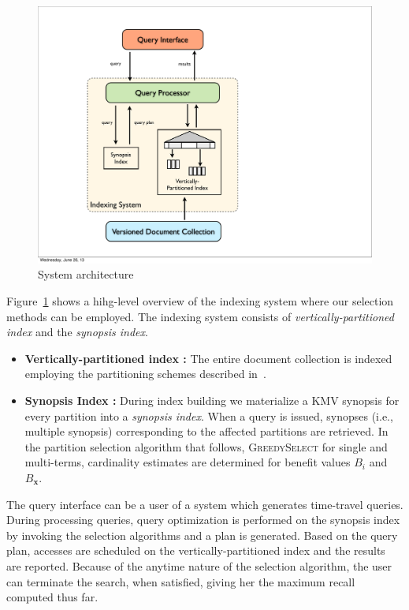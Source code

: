 \begin{figure}[tb]
  \centering
    \includegraphics[width=0.6\columnwidth]{resources/selection-sysarch.pdf}
  \caption{System architecture} 
    \label{fig:selection_sysarch}
\end{figure}

Figure~\ref{fig:selection_sysarch} shows a hihg-level overview of the indexing system where our selection methods can be employed. The indexing system consists of \emph{vertically-partitioned index} and the \emph{synopsis index}.

\begin{itemize}

\item{\textbf{Vertically-partitioned index :}} The entire document collection is indexed employing the partitioning schemes described in~\cite{kberberi:sigir2007}. 

\item{\textbf{Synopsis Index :}} During index building we materialize a KMV synopsis for every partition into a \emph{synopsis index}. When a query is issued, synopses (i.e., multiple synopsis) corresponding to the affected partitions are retrieved. In the partition selection algorithm that follows, \textsc{GreedySelect} for single and multi-terms, cardinality estimates are determined for benefit values $B_i$ and $B_\mathbf{x}$.

\end{itemize}

The query interface can be a user of a system which generates time-travel queries. During processing queries, query optimization is performed on the synopsis index by invoking the selection algorithms and a plan is generated. Based on the query plan, accesses are scheduled on the vertically-partitioned index and the results are reported. Because of the anytime nature of the selection algorithm, the user can terminate the search, when satisfied, giving her the maximum recall computed thus far.

